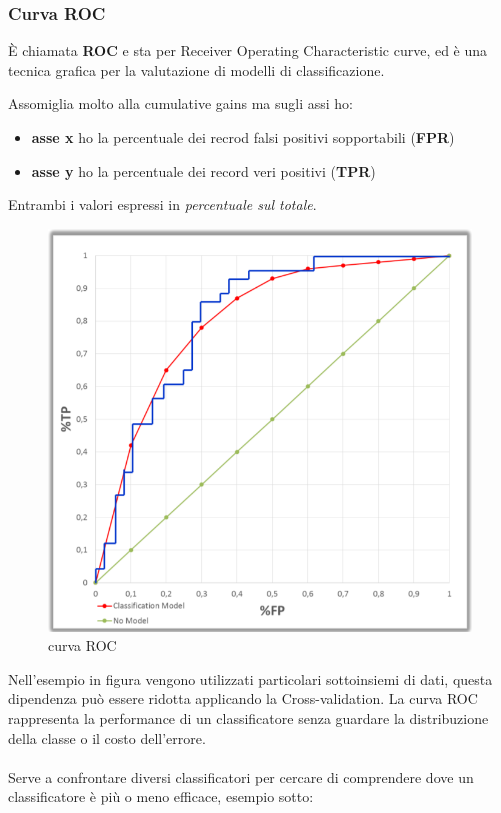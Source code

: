 \subsubsection{Curva ROC}
\begin{defn}
	\`E chiamata \textbf{ROC} e sta per Receiver Operating Characteristic curve, ed è una tecnica grafica per la valutazione di modelli di classificazione.
\end{defn} 
\noindent
Assomiglia molto alla cumulative gains ma sugli assi ho:
\begin{itemize}
	\item \textbf{asse x} ho la percentuale dei recrod falsi positivi sopportabili (\textbf{FPR})
	\item \textbf{asse y} ho la percentuale dei record veri positivi (\textbf{TPR})
\end{itemize}
Entrambi i valori espressi in \textit{percentuale sul totale}. 
\begin{figure}[H]
	\centering
	\includegraphics[height=0.6 \linewidth]{classification/pict/roc.png}
	\caption{curva ROC}
\end{figure}
Nell'esempio in figura vengono utilizzati particolari sottoinsiemi di dati, questa dipendenza può essere ridotta applicando la Cross-validation. La curva ROC rappresenta la performance di un classificatore senza guardare la distribuzione della classe o il costo dell'errore.\\
\\
Serve a confrontare diversi classificatori per cercare di comprendere dove un classificatore \`e pi\`u o meno efficace, esempio sotto:

